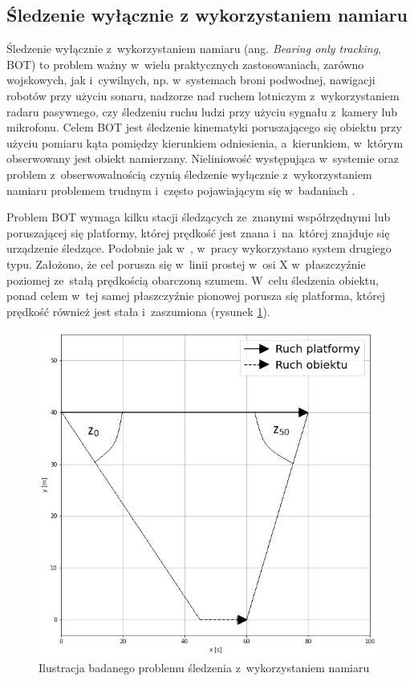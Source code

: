 \subsection{Śledzenie wyłącznie z wykorzystaniem namiaru}
\label{subsec:bot}
Śledzenie wyłącznie z~wykorzystaniem namiaru (ang. \textit{Bearing only tracking}, BOT) to problem ważny w~wielu praktycznych zastosowaniach, zarówno wojskowych, jak i~cywilnych, np. w~systemach broni podwodnej, nawigacji robotów przy użyciu sonaru, nadzorze nad ruchem lotniczym z~wykorzystaniem radaru pasywnego, czy śledzeniu ruchu ludzi przy użyciu sygnału z~kamery lub mikrofonu. Celem BOT jest śledzenie kinematyki poruszającego się obiektu przy użyciu pomiaru kąta pomiędzy kierunkiem odniesienia, a~kierunkiem, w~którym obserwowany jest obiekt namierzany. Nieliniowość występująca w~systemie oraz problem z~obserwowalnością czynią śledzenie wyłącznie z~wykorzystaniem namiaru problemem trudnym i~często pojawiającym się w~badaniach \cite{BOT_Chalasani}\cite{BOT_Arulampalam}. \par
Problem BOT wymaga kilku stacji śledzących ze~znanymi współrzędnymi lub poruszającej się platformy, której prędkość jest znana i~na~której znajduje się urządzenie śledzące. Podobnie jak w~\cite{BOT_Chalasani}, w~pracy wykorzystano system drugiego typu. Założono, że cel porusza się w~linii prostej w~osi X w~płaszczyźnie poziomej ze~stałą prędkością obarczoną szumem. W~celu śledzenia obiektu, ponad celem w~tej samej płaszczyźnie pionowej porusza się platforma, której prędkość również jest stała i~zaszumiona (rysunek \ref{fig:BOT_illustration}). 
\begin{figure}
	\centering
	\includegraphics[width=0.7\linewidth]{BOT_illustration.jpg}
	\caption{Ilustracja badanego problemu śledzenia z~wykorzystaniem namiaru}
	\label{fig:BOT_illustration}
\end{figure}
